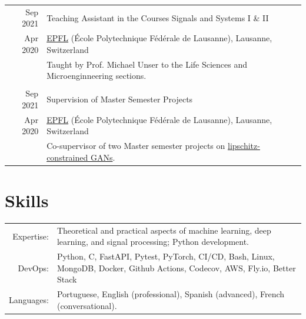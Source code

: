 \documentclass[a4paper,11pt]{article}
\def\datespace{-2pt}
\def\title-main-sep{4pt}
\begin{document}
    \begin{tabular}{r|p{13cm}}

	  {\small Sep 2021} & Teaching Assistant in the Courses Signals and Systems I \& II \\[\datespace]
	  {\small Apr 2020} & \small{\href{https://www.epfl.ch/en/}{EPFL} (École Polytechnique Fédérale de Lausanne), Lausanne, Switzerland} \\[\title-main-sep]
    & {\footnotesize Taught by Prof. Michael Unser to the Life Sciences and Microenginneering sections.} \\

    \multicolumn{2}{c}{} \\

    {\small Sep 2021} & Supervision of Master Semester Projects \\[\datespace]
    {\small Apr 2020} & \small{\href{https://www.epfl.ch/en/}{EPFL} (École Polytechnique Fédérale de Lausanne), Lausanne, Switzerland} \\[\title-main-sep]
    & \footnotesize{Co-supervisor of two Master semester projects on \href{https://bigwww.epfl.ch/teaching/projects/abstract.html?f=00388}{lipschitz-constrained GANs}.} \\

    \end{tabular}


    \vspace{15pt}

    \section{Skills}

    \begin{tabular}{rp{13cm}}
  	Expertise:  & Theoretical and practical aspects of machine learning, deep learning, and signal processing; Python development.
    \vspace{5pt}\\
    DevOps:  &  Python, C, FastAPI, Pytest, PyTorch, CI/CD, Bash, Linux, MongoDB, Docker, Github Actions, Codecov, AWS, Fly.io, Better Stack \vspace{5pt}\\
    Languages: & Portuguese, English (professional), Spanish (advanced), French (conversational).
    \end{tabular}
\end{document}
